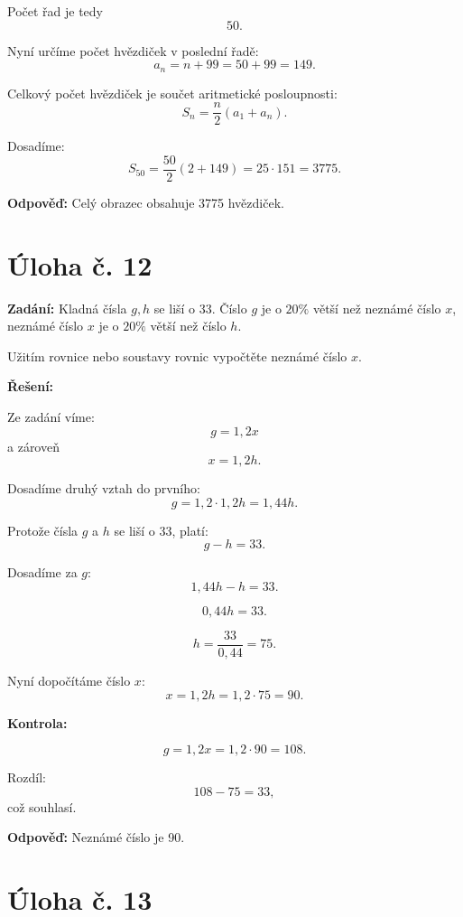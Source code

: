 \documentclass[12pt,a4paper]{article}
\begin{document}
Počet řad je tedy
\[
50.
\]

Nyní určíme počet hvězdiček v poslední řadě:
\[
a_n=n+99=50+99=149.
\]

Celkový počet hvězdiček je součet aritmetické posloupnosti:
\[
S_n=\frac{n}{2}(a_1+a_n).
\]

Dosadíme:
\[
S_{50}=\frac{50}{2}(2+149)=25\cdot 151=3775.
\]

\bigskip

\textbf{Odpověď:}  
Celý obrazec obsahuje 3775 hvězdiček.


\newpage
\section*{Úloha č. 12}

\textbf{Zadání:}  
Kladná čísla \(g, h\) se liší o 33. Číslo \(g\) je o \(20\%\) větší než neznámé číslo \(x\), neznámé číslo \(x\) je o \(20\%\) větší než číslo \(h\).

Užitím rovnice nebo soustavy rovnic vypočtěte neznámé číslo \(x\).

\bigskip

\textbf{Řešení:}

Ze zadání víme:
\[
g = 1{,}2x
\]
a zároveň
\[
x = 1{,}2h.
\]

Dosadíme druhý vztah do prvního:
\[
g = 1{,}2 \cdot 1{,}2h = 1{,}44h.
\]

Protože čísla \(g\) a \(h\) se liší o 33, platí:
\[
g-h=33.
\]

Dosadíme za \(g\):
\[
1{,}44h-h=33.
\]

\[
0{,}44h=33.
\]

\[
h=\frac{33}{0{,}44}=75.
\]

Nyní dopočítáme číslo \(x\):
\[
x=1{,}2h=1{,}2\cdot 75=90.
\]

\bigskip

\textbf{Kontrola:}

\[
g=1{,}2x=1{,}2\cdot 90=108.
\]

Rozdíl:
\[
108-75=33,
\]
což souhlasí.

\bigskip

\textbf{Odpověď:}  
Neznámé číslo je 90.


\newpage
\section*{Úloha č. 13}
\end{document}
